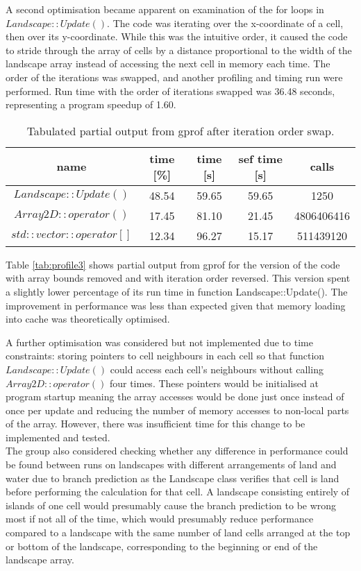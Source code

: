 A second optimisation became apparent on examination of the for loops in $Landscape::Update()$.
The code was iterating over the x-coordinate of a cell, then over its y-coordinate.
While this was the intuitive order, it caused the code to stride through the array of cells by a distance proportional to the width of the landscape array instead of accessing the next cell in memory each time.
The order of the iterations was swapped, and another profiling and timing run were performed.
Run time with the order of iterations swapped was 36.48 seconds, representing a program speedup of 1.60.

\begin{table}[h!]
\caption{Tabulated partial output from gprof after iteration order swap.}
\label{tab: profile 3}
 \begin{center}
\begin{tabular}{|c|c|c|c|c|}
\hline
name & time [\%] & time [s] & sef time [s] & calls\\
\hline
$Landscape::Update()$ & 48.54 & 59.65 & 59.65 &1250 \\
\hline
$Array2D::operator()$& 17.45& 81.10& 21.45 &4806406416 \\
\hline
$std::vector::operator[]$& 12.34& 96.27 &15.17 &511439120\\
\hline
\end{tabular}
\end{center}
\end{table}

Table \ref{tab:profile3} shows partial output from gprof for the version of the code with array bounds removed and with iteration order reversed.
This version spent a slightly lower percentage of its run time in function Landscape::Update().
The improvement in performance was less than expected given that memory loading into cache was theoretically optimised.

A further optimisation was considered but not implemented due to time constraints: storing pointers to cell neighbours in each cell so that function $Landscape::Update()$ could access each cell's neighbours without calling $Array2D::operator()$ four times.
These pointers would be initialised at program startup meaning the array accesses would be done just once instead of once per update and reducing the number of memory accesses to non-local parts of the array.
However, there was insufficient time for this change to be implemented and tested.\\

The group also considered checking whether any difference in performance could be found between runs on landscapes with different arrangements of land and water due to branch prediction as the Landscape class verifies that cell is land before performing the calculation for that cell.
A landscape consisting entirely of islands of one cell would presumably cause the branch prediction to be wrong most if not all of the time, which would presumably reduce performance compared to a landscape with the same number of land cells arranged at the top or bottom of the landscape, corresponding to the beginning or end of the landscape array.


